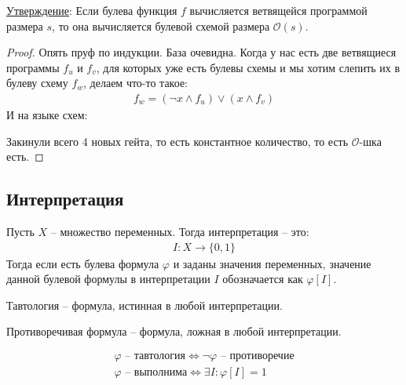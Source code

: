 \underline{Утверждение}: Если булева функция $f$ вычисляется ветвящейся программой размера $s$, то она вычисляется булевой схемой размера $\mathcal{O}(s)$.
\begin{proof}
  Опять пруф по индукции. База очевидна. Когда у нас есть две ветвящиеся программы $f_u$ и $f_v$, для которых уже есть булевы схемы и мы хотим слепить их в булеву схему $f_w$, делаем что-то такое:
  \begin{gather*}
    f_w = (\lnot x \land f_u) \lor (x \land f_v)
  \end{gather*}
  И на языке схем:
  \begin{center}
  \end{center}
  Закинули всего 4 новых гейта, то есть константное количество, то есть $\mathcal{O}$-шка есть.
\end{proof}

\subsection{Интерпретация}
\begin{conj}
  Пусть $X$ -- множество переменных. Тогда интерпретация -- это:
  \begin{gather*}
    I : X \longrightarrow \{0,1\}
  \end{gather*}
  Тогда если есть булева формула $\varphi$ и заданы значения переменных, значение данной булевой формулы 
  в интерпретации $I$ обозначается как $\varphi[I]$.
\end{conj}
\begin{conj}
  Тавтология -- формула, истинная в любой интерпретации.
\end{conj}
\begin{conj}
  Противоречивая формула -- формула, ложная в любой интерпретации.
\end{conj}
\begin{gather*}
  \varphi \text{ -- тавтология} \Longleftrightarrow \lnot \varphi \text{ -- противоречие} \\
  \varphi \text{ -- выполнима} \Longleftrightarrow \exists I : \varphi[I] = 1
\end{gather*}
